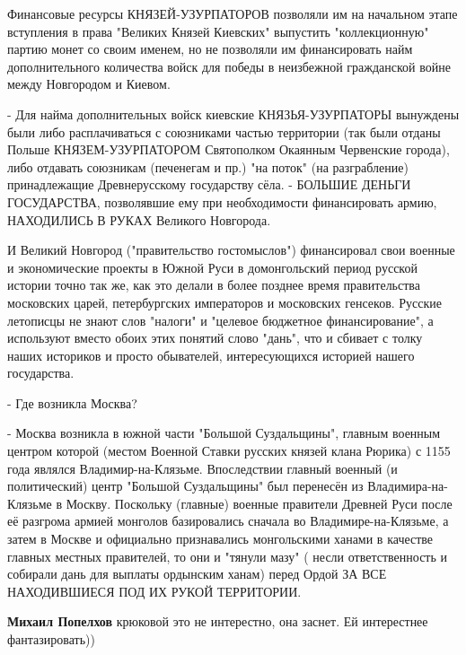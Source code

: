 \begin{itemize}
Финансовые
ресурсы КНЯЗЕЙ-УЗУРПАТОРОВ позволяли им на начальном этапе вступления в права
"Великих Князей Киевских" выпустить "коллекционную" партию монет со своим
именем, но не позволяли им финансировать найм дополнительного количества войск
для победы в неизбежной гражданской войне между Новгородом и Киевом. 

- Для
найма дополнительных войск киевские КНЯЗЬЯ-УЗУРПАТОРЫ вынуждены были либо
расплачиваться с союзниками частью территории (так были отданы Польше
КНЯЗЕМ-УЗУРПАТОРОМ Святополком Окаянным Червенские города), либо отдавать
союзникам (печенегам и пр.) "на поток" (на разграбление) принадлежащие
Древнерусскому государству сёла. - БОЛЬШИЕ ДЕНЬГИ ГОСУДАРСТВА, позволявшие ему
при необходимости финансировать армию, НАХОДИЛИСЬ В РУКАХ Великого Новгорода. 

И Великий Новгород ("правительство гостомыслов") финансировал свои военные и
экономические проекты в Южной Руси в домонгольский период русской истории точно
так же, как это делали в более позднее время правительства московских царей,
петербургских императоров и московских генсеков. Русские летописцы не знают
слов "налоги" и "целевое бюджетное финансирование", а используют вместо обоих
этих понятий слово "дань", что и сбивает с толку наших историков и просто
обывателей, интересующихся историей нашего государства. 

- Где возникла Москва?

- Москва возникла в южной части "Большой Суздальщины", главным военным центром
которой (местом Военной Ставки русских князей клана Рюрика) с 1155 года являлся
Владимир-на-Клязьме. Впоследствии главный военный (и политический) центр
"Большой Суздальщины" был перенесён из Владимира-на-Клязьме в Москву. Поскольку
(главные) военные правители Древней Руси после её разгрома армией монголов
базировались сначала во Владимире-на-Клязьме, а затем в Москве и официально
признавались монгольскими ханами в качестве главных местных правителей, то они
и "тянули мазу" ( несли ответственность и собирали дань для выплаты ордынским
ханам) перед Ордой ЗА ВСЕ НАХОДИВШИЕСЯ ПОД ИХ РУКОЙ ТЕРРИТОРИИ.



\begin{itemize}
 
\textbf{Михаил Попелхов} крюковой это не интерестно, она заснет. Ей интерестнее фантазировать))
\end{itemize}



\end{itemize}

